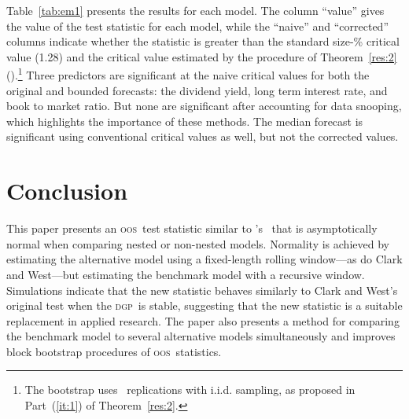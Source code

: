 \documentclass[11pt,fleqn]{article}
\newcommand\poscw{\citeauthor{ClW:06}'s \citeyearpar{ClW:06,ClW:07}}
\theoremstyle{definition}
\newcommand{\dgp}{\textsc{dgp}}
\newcommand{\oos}{\textsc{oos}}
\begin{document}
Table~\ref{tab:em1} presents the results for each model.  The column
``value'' gives the value of the test statistic for each model, while
the ``naive'' and ``corrected'' columns indicate whether the statistic
is greater than the standard size-\bootsize\% critical value (1.28)
and the critical value estimated by the procedure of
Theorem~\ref{res:2} (\empiricalcriticalvalue).\footnote{The bootstrap
  uses \nboot\ replications with i.i.d. sampling, as proposed in
  Part~(\ref{it:1}) of Theorem~\ref{res:2}.}  Three predictors are
significant at the naive critical values for both the original and
bounded forecasts: the dividend yield, long term interest rate, and
book to market ratio.  But none are significant after accounting for
data snooping, which highlights the importance of these methods.  The
median forecast is significant using conventional critical values as
well, but not the corrected values.

\begin{table}[tb!]
  \centering
  \empiricaltable
\caption{Results from \oos\ comparison of equity premium prediction
  models; the benchmark is the recursive sample mean of the equity
  premium and each alternative model is a constant and single lag of
  the variable listed in the ``predictor'' column.  The dataset begins
  in 1927 and ends in 2009 and is annual data. The ``value'' column
  lists the value of this paper's \oos\ statistic, the ``naive''
  column indicates whether the statistic is significant at standard
  critical values, and the ``corrected'' column indicates significance
  using the critical values proposed in Theorem~\ref{res:2} that
  account for the number of models.  See Section~\ref{sec:3} for details.}
\label{tab:em1}
\end{table}


\section{Conclusion}\label{sec:4}
This paper presents an \oos\ test statistic similar to \poscw\ that is
asymptotically normal when comparing nested or non-nested models.
Normality is achieved by estimating the alternative model using a
fixed-length rolling window---as do Clark and West---but estimating
the benchmark model with a recursive window.  Simulations indicate
that the new statistic behaves similarly to Clark and West's original
test when the \dgp\ is stable, suggesting that the new statistic is
a suitable replacement in applied research.  The paper also presents a
method for comparing the benchmark model to several alternative models
simultaneously and improves block bootstrap procedures of \oos\
statistics.
\end{document}
